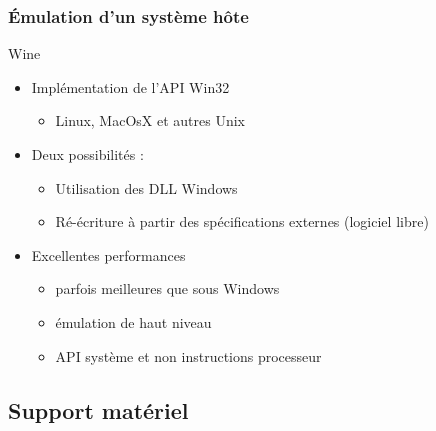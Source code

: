 \begin{frame}
\frametitle{Émulation d'un système hôte}
\begin{exampleblock}{Wine} 
\begin{itemize}
\item Implémentation de l'API Win32
\begin{itemize}
\item Linux, MacOsX et autres Unix
\end{itemize}

\item Deux possibilités :
\begin{itemize}
\item Utilisation des DLL Windows 
\item Ré-écriture à partir des spécifications externes (logiciel libre)
\end{itemize}
\item Excellentes performances
\begin{itemize}
\item parfois meilleures que sous Windows
\item émulation de haut niveau
\item API système et non instructions processeur
\end{itemize}

\end{itemize}
\end{exampleblock}
\end{frame}

\subsection{Support matériel}


